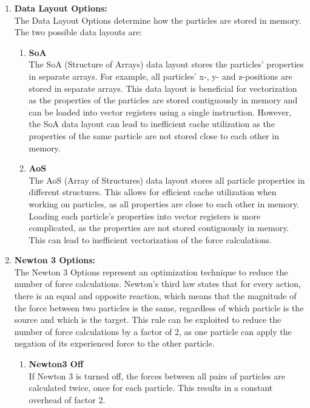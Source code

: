 \begin{enumerate}[label=\textbf{\arabic*.}]
\begin{enumerate}
            \end{enumerate}


      \item \textbf{Data Layout Options:} \\
            The Data Layout Options determine how the particles are stored in memory. The two possible data layouts are:
            \begin{enumerate}
                  \item \textbf{SoA} \\
                        The SoA (Structure of Arrays) data layout stores the particles' properties in separate arrays. For example, all particles' x-, y- and z-positions are stored in separate arrays. This data layout is beneficial for vectorization as the properties of the particles are stored contiguously in memory and can be loaded into vector registers using a single instruction. However, the SoA data layout can lead to inefficient cache utilization as the properties of the same particle are not stored close to each other in memory.

                  \item \textbf{AoS} \\
                        The AoS (Array of Structures) data layout stores all particle properties in different structures. This allows for efficient cache utilization when working on particles, as all properties are close to each other in memory.
                        Loading each particle's properties into vector registers is more complicated, as the properties are not stored contiguously in memory. This can lead to inefficient vectorization of the force calculations.
            \end{enumerate}

      \item \textbf{Newton 3 Options:} \\
            The Newton 3 Options represent an optimization technique to reduce the number of force calculations. Newton's third law states that for every action, there is an equal and opposite reaction, which means that the magnitude of the force between two particles is the same, regardless of which particle is the source and which is the target. This rule can be exploited to reduce the number of force calculations by a factor of 2, as one particle can apply the negation of its experienced force to the other particle.
            \begin{enumerate}
                  \item \textbf{Newton3 Off} \\
                        If Newton 3 is turned off, the forces between all pairs of particles are calculated twice, once for each particle. This results in a constant overhead of factor 2.


\end{enumerate}
\end{enumerate}
